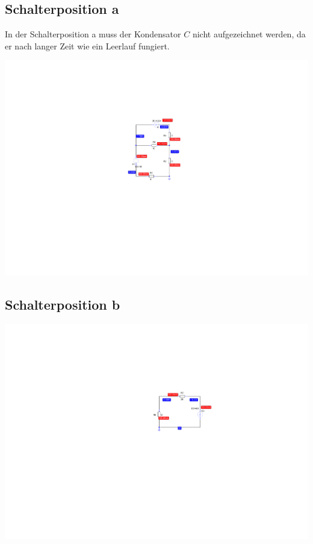 \documentclass[11pt]{scrartcl}
\begin{document}
\subsection{Schalterposition a}
In der Schalterposition a muss der Kondensator $C$ nicht aufgezeichnet werden, da er nach langer Zeit wie ein Leerlauf fungiert.

\begin{center}
  \includegraphics[scale=1.6]{./Assets/SP_a}
  \label{fig:a}
\end{center}
\newpage

\subsection{Schalterposition b}
\begin{center}
  \includegraphics[scale=1.6]{./Assets/SP_b}
  \label{fig:b}
\end{center}
\end{document}
